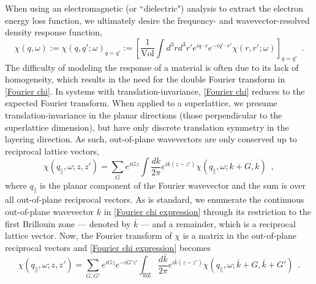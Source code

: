 \documentclass[submission, Phys]{SciPost}
\newcommand{\lb}{\left[}
\newcommand{\vol}{\text{Vol}}
\newcommand{\rb}{\right]}
\begin{document}
When using an electromagnetic (or ``dielectric") analysis to extract the electron energy loss function, we ultimately desire the frequency- and wavevector-resolved density response function,
\begin{equation}
    \label{Fourier chi}
    \chi(q,\omega):=\chi(q,q';\omega)_{q=q'}
    :=
    \lb\frac{1}{\vol}\int d^3 r d^3 r' e^{iq\cdot r} e^{-i q'\cdot r'}\chi(r,r';\omega)\rb_{q=q'}
    \,\,\,.
\end{equation}
The difficulty of modeling the response of a material is often due to its lack of homogeneity, which results in the need for the double Fourier transform in \eqref{Fourier chi}.  In systems with translation-invariance, \eqref{Fourier chi} reduces to the expected Fourier transform.  When applied to a superlattice, we presume translation-invariance in the planar directions (those perpendicular to the superlattice dimension), but have only discrete translation symmetry in the layering direction.  As such, out-of-plane wavevectors are only conserved up to reciprocal lattice vectors,
\begin{equation}
    \label{Fourier chi expression}
    \chi(q_\parallel,\omega;z,z') = \sum_G e^{iG z} \int \frac{dk}{2\pi} e^{ik(z-z')}\chi(q_\parallel,\omega;k+G,k)
    \,\,\,,
\end{equation}
where $q_\parallel$ is the planar component of the Fourier wavevector and the sum is over all out-of-plane reciprocal vectors.  As is standard, we enumerate the continuous out-of-plane wavevector $k$ in \eqref{Fourier chi expression} through its restriction to the first Brillouin zone --- denoted by $\bar k$ --- and a remainder, which is a reciprocal lattice vector.  Now, the Fourier transform of $\chi$ is a matrix in the out-of-plane reciprocal vectors and \eqref{Fourier chi expression} becomes
\begin{equation}
    \label{Fourier chi G matrix}
    \chi(q_\parallel,\omega;z,z') = \sum_{G,G'} e^{iG z} e^{-i G' z'} \int_\text{BZ} \frac{d\bar k}{2\pi} e^{i\bar k(z-z')}\chi(q_\parallel,\omega;\bar k+G,\bar k+G')
    \,\,\,.
\end{equation}
\end{document}
